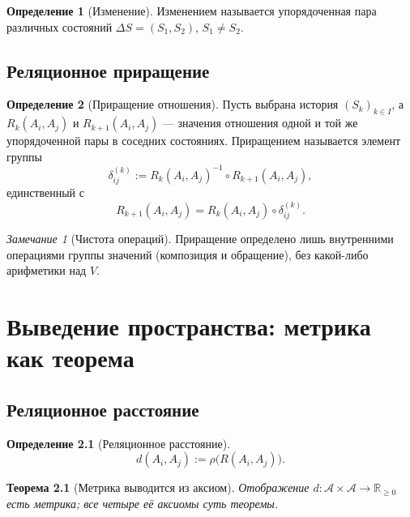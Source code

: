\documentclass[12pt,a4paper,oneside]{book}
\theoremstyle{definition}
\newtheorem{definition}{Определение}[chapter]
\theoremstyle{plain}
\newtheorem{theorem}{Теорема}[chapter]
\theoremstyle{remark}
\newtheorem{remark}{Замечание}[chapter]
\newcommand{\Parts}{\mathcal A}
\newcommand{\Rel}{R}
\newcommand{\Values}{V}
\newcommand{\State}{S}
\newcommand{\comp}{\circ}
\newcommand{\norm}{\rho}
\begin{document}
\begin{definition}[Изменение]
Изменением называется упорядоченная пара различных состояний
$\Delta\State=(\State_1,\State_2)$, $\State_1\neq\State_2$.
\end{definition}

\section{Реляционное приращение}

\begin{definition}[Приращение отношения]\label{def:increment}
Пусть выбрана история $(\State_k)_{k\in I}$, а $\Rel_k(A_i,A_j)$ и
$\Rel_{k+1}(A_i,A_j)$ --- значения отношения одной и той же упорядоченной пары в
соседних состояниях. Приращением называется элемент группы
\[
\delta_{ij}^{(k)}:=\Rel_k(A_i,A_j)^{-1}\comp\Rel_{k+1}(A_i,A_j),
\]
единственный с
\[
\Rel_{k+1}(A_i,A_j)=\Rel_k(A_i,A_j)\comp\delta_{ij}^{(k)}.
\]
\end{definition}

\begin{remark}[Чистота операций]
Приращение определено лишь внутренними операциями группы значений (композиция и
обращение), без какой-либо арифметики над $\Values$.
\end{remark}

\chapter{Выведение пространства: метрика как теорема}

\section{Реляционное расстояние}

\begin{definition}[Реляционное расстояние]
\[
d(A_i,A_j):=\norm\bigl(\Rel(A_i,A_j)\bigr).
\]
\end{definition}

\begin{theorem}[Метрика выводится из аксиом]\label{thm:metric}
Отображение $d:\Parts\times\Parts\to\mathbb R_{\ge0}$ есть метрика; все четыре её
аксиомы суть теоремы.
\end{theorem}
\end{document}
